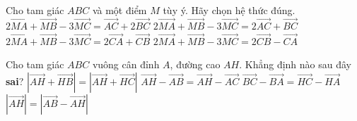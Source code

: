 \begin{ex}%
Cho tam giác $ABC$ và một điểm $M$ tùy ý. Hãy chọn hệ thức đúng.
\choice
{$2\overrightarrow{MA}+\overrightarrow{MB}-3\overrightarrow{MC}=\overrightarrow{AC}+2\overrightarrow{BC}$}
{$2\overrightarrow{MA}+\overrightarrow{MB}-3\overrightarrow{MC}=2\overrightarrow{AC}+\overrightarrow{BC}$}
{\True $2\overrightarrow{MA}+\overrightarrow{MB}-3\overrightarrow{MC}=2\overrightarrow{CA}+\overrightarrow{CB}$}
{$2\overrightarrow{MA}+\overrightarrow{MB}-3\overrightarrow{MC}=2\overrightarrow{CB}-\overrightarrow{CA}$}
\end{ex}

\begin{ex}%
Cho tam giác $ABC$ vuông cân đỉnh $A$, đường cao $AH$. Khẳng định nào sau đây \textbf{sai}?
\choice
{$\left| \overrightarrow{AH}+\overrightarrow{HB}\right|=\left| \overrightarrow{AH}+\overrightarrow{HC}\right|$}
{\True $\overrightarrow{AH}-\overrightarrow{AB}=\overrightarrow{AH}-\overrightarrow{AC}$}
{$\overrightarrow{BC}-\overrightarrow{BA}=\overrightarrow{HC}-\overrightarrow{HA}$}
{$\left| \overrightarrow{AH}\right|=\left| \overrightarrow{AB}-\overrightarrow{AH}\right|$}
\end{ex}

